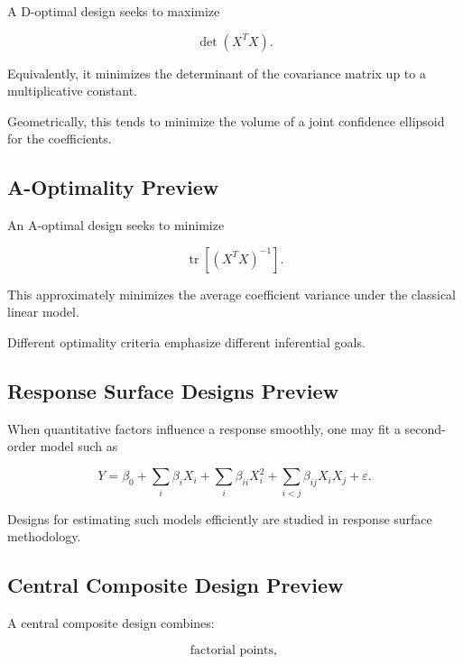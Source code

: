 A D-optimal design seeks to maximize

\[
\boxed{
\det(X^TX).
}
\]

Equivalently, it minimizes the determinant of the covariance matrix up to
a multiplicative constant.

Geometrically, this tends to minimize the volume of a joint confidence
ellipsoid for the coefficients.

\subsection{A-Optimality Preview}
\label{subsec:a-optimality-preview}

An A-optimal design seeks to minimize

\[
\boxed{
\operatorname{tr}
\left[
(X^TX)^{-1}
\right].
}
\]

This approximately minimizes the average coefficient variance under the
classical linear model.

Different optimality criteria emphasize different inferential goals.

\subsection{Response Surface Designs Preview}
\label{subsec:response-surface-designs-preview}

When quantitative factors influence a response smoothly, one may fit a
second-order model such as

\[
\boxed{
Y
=
\beta_0
+
\sum_i
\beta_iX_i
+
\sum_i
\beta_{ii}X_i^2
+
\sum_{i<j}
\beta_{ij}X_iX_j
+
\varepsilon.
}
\]

Designs for estimating such models efficiently are studied in response
surface methodology.

\subsection{Central Composite Design Preview}
\label{subsec:central-composite-design-preview}

A central composite design combines:

\[
\boxed{
\text{factorial points},
}
\]

